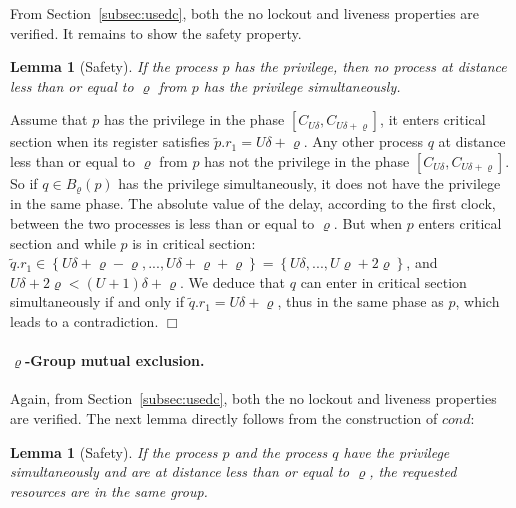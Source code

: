 \documentclass[11pt]{article}
\newenvironment{proof}{{\bf Proof. } }{{\hfill $\Box$}\vspace{.5pc}}
\newtheorem{lemma}[theorem]{Lemma}
\begin{document}
From Section~\ref{subsec:usedc}, both the no lockout and liveness properties are verified. It remains to show the safety property.

\begin{lemma}[Safety]
If the process $p$ has the privilege, then no process at distance less than
or equal to $\varrho $ from $p$ has the privilege simultaneously. 
\end{lemma}

\begin{proof}
Assume that $p$ has the privilege in the phase $\left[ C_{U\delta },C_{U\delta  +\varrho }\right]$, 
 it enters critical section  when its register  satisfies $\widetilde{p}.r_{1}=U\delta  +\varrho $. 
Any other process $q$ at distance less than or equal to $\varrho$ from $p$ has not the privilege in the phase 
$\left[ C_{U\delta  },C_{U\delta  +\varrho }\right]$.  So if $q\in B_{\varrho }\left( p\right) $ has the
privilege simultaneously, it does not have the privilege in the same phase. The absolute value of the delay,
according to the first clock, between the two processes is less than or equal to $\varrho$.  But when $p$ enters critical section and while $p$ is in critical section:
 $\widetilde{q}.r_{1}\in \left\{ U\delta  +\varrho -\varrho ,...,U\delta  +\varrho +\varrho
\right\} =\left\{ U\delta  ,...,U\varrho +2\varrho \right\} $, 
and $U\delta  +2\varrho  <\left( U+1\right) \delta  +\varrho $.
 We deduce that $q$ can enter in critical section simultaneously if and only if $\widetilde{q}.r_{1}=U\delta  +\varrho $, thus in the same phase as $p$, which leads to a
contradiction. 
\end{proof}



\paragraph{$\varrho$-Group mutual exclusion.} 

Again, from Section~\ref{subsec:usedc}, both the no lockout and liveness properties are verified. 
The next lemma directly follows from the construction of $cond$:
\begin{lemma}[Safety]
If the process $p$ and the process $q$ have the privilege simultaneously and are at distance less than or equal to $\varrho $,
the requested resources are in the same group.
\end{lemma}
\end{document}
